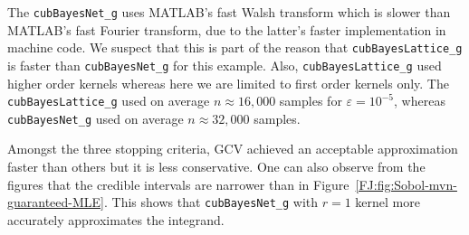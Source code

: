 \documentclass[graybox,footinfo]{svmult}
\begin{document}
The \texttt{cubBayesNet\_g} uses MATLAB's fast Walsh transform which is slower than MATLAB's fast Fourier transform, due to the latter's faster implementation in machine code. We suspect that this is part of the reason that \texttt{cubBayesLattice\_g} is faster than \texttt{cubBayesNet\_g} for this example. Also, \texttt{cubBayesLattice\_g} used higher order kernels whereas here we are limited to first order kernels only. The \texttt{cubBayesLattice\_g} used on average $n \approx 16{,}000$ samples for $\varepsilon = 10^{-5}$, whereas \texttt{cubBayesNet\_g} used on average $n \approx 32{,}000$ samples.

Amongst the three stopping criteria, GCV achieved an acceptable approximation faster than others but it is less conservative. 
One can also observe from the figures that the credible intervals are narrower than in Figure~\ref{FJ:fig:Sobol-mvn-guaranteed-MLE}.
This shows that \texttt{cubBayesNet\_g} with $r=1$ kernel more accurately approximates the integrand.
\end{document}
